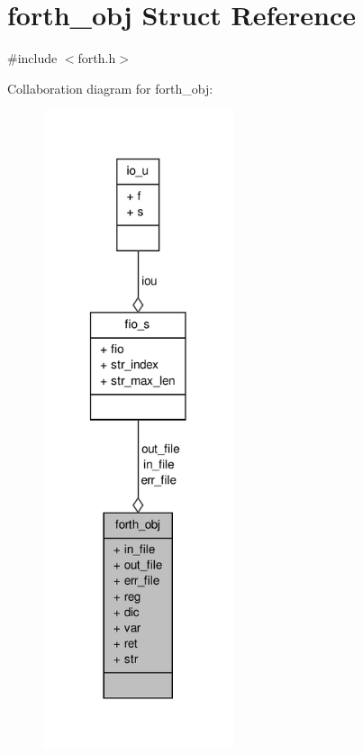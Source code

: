 \hypertarget{structforth__obj}{\section{forth\-\_\-obj Struct Reference}
\label{structforth__obj}
}


{\ttfamily \#include $<$forth.\-h$>$}



Collaboration diagram for forth\-\_\-obj\-:
\nopagebreak
\begin{figure}[H]
\begin{center}
\leavevmode
\includegraphics[width=158pt]{structforth__obj__coll__graph}
\end{center}
\end{figure}
